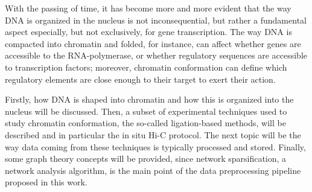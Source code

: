 
With the passing of time, it has become more and more evident that the way DNA is organized in the nucleus is not inconsequential, but rather a fundamental aspect especially, but not exclusively, for gene transcription. The way DNA is compacted into chromatin and folded, for instance, can affect whether genes are accessible to the RNA-polymerase, or whether regulatory sequences are accessible to transcription factors; moreover, chromatin conformation can define which regulatory elements are close enough to their target to exert their action\cite{chromatinfiber2015,chromatinorganization2019}.

Firstly, how DNA is shaped into chromatin and how this is organized into the nucleus will be discussed. Then, a subset of experimental techniques used to study chromatin conformation, the so-called ligation-based methods, will be described and in particular the in situ Hi-C protocol. The next topic will be the way data coming from these techniques is typically processed and stored. Finally, some graph theory concepts will be provided, since network sparsification, a network analysis algorithm, is the main point of the data preprocessing pipeline proposed in this work.

